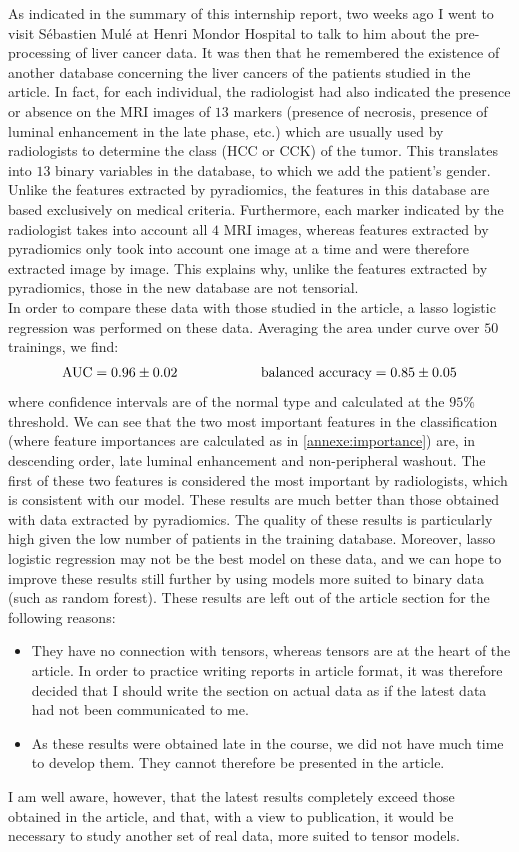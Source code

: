 \documentclass[preprint,12pt]{elsarticle}
\begin{document}
\noindent As indicated in the summary of this internship report, two weeks ago I went to visit Sébastien Mulé at Henri Mondor Hospital to talk to him about the pre-processing of liver cancer data. It was then that he remembered the existence of another database concerning the liver cancers of the patients studied in the article. In fact, for each individual, the radiologist had also indicated the presence or absence on the MRI images of $13$ markers (presence of necrosis, presence of luminal enhancement in the late phase, etc.) which are usually used by radiologists to determine the class (HCC or CCK) of the tumor. This translates into $13$ binary variables in the database, to which we add the patient's gender. Unlike the features extracted by pyradiomics, the features in this database are based exclusively on medical criteria. Furthermore, each marker indicated by the radiologist takes into account all $4$ MRI images, whereas features extracted by pyradiomics only took into account one image at a time and were therefore extracted image by image. This explains why, unlike the features extracted by pyradiomics, those in the new database are not tensorial.\\
\indent In order to compare these data with those studied in the article, a lasso logistic regression was performed on these data. Averaging the area under curve over $50$ trainings, we find:
$$
\text{AUC} = 0.96 \pm 0.02 \hspace{60 pt} \text{balanced accuracy} = 0.85 \pm 0.05
$$
where confidence intervals are of the normal type and calculated at the $95 \%$ threshold. We can see that the two most important features in the classification (where feature importances are calculated as in \ref{annexe:importance}) are, in descending order, late luminal enhancement and non-peripheral washout. The first of these two features is considered the most important by radiologists, which is consistent with our model. These results are much better than those obtained with data extracted by pyradiomics. The quality of these results is particularly high given the low number of patients in the training database. Moreover, lasso logistic regression may not be the best model on these data, and we can hope to improve these results still further by using models more suited to binary data (such as random forest). These results are left out of the article section for the following reasons:
\begin{itemize}[label = $\bullet$]
    \item They have no connection with tensors, whereas tensors are at the heart of the article. In order to practice writing reports in article format, it was therefore decided that I should write the section on actual data as if the latest data had not been communicated to me.
    \item As these results were obtained late in the course, we did not have much time to develop them. They cannot therefore be presented in the article.
\end{itemize}
I am well aware, however, that the latest results completely exceed those obtained in the article, and that, with a view to publication, it would be necessary to study another set of real data, more suited to tensor models.
\end{document}
